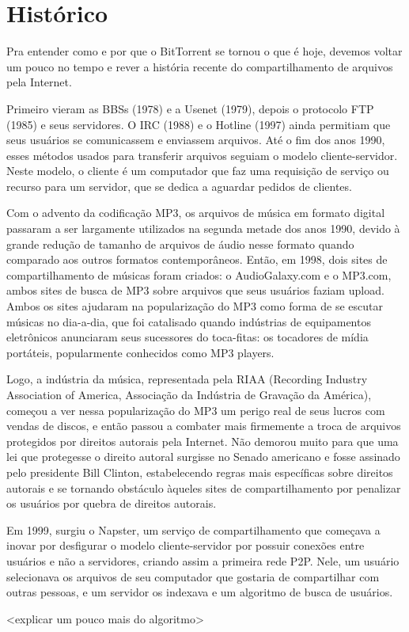 \chapter{Histórico}

Pra entender como e por que o BitTorrent se tornou o que é hoje, devemos voltar um pouco no tempo e rever a história recente do compartilhamento de arquivos pela Internet. 

Primeiro vieram as BBSs (1978) e a Usenet (1979), depois o protocolo FTP (1985) e seus servidores. O IRC (1988) e o  Hotline (1997) ainda permitiam que seus usuários se comunicassem e enviassem arquivos. Até o fim dos anos 1990, esses métodos usados para transferir arquivos seguiam o modelo cliente-servidor. Neste modelo, o cliente é um computador que faz uma requisição de serviço ou recurso para um servidor, que se dedica a aguardar pedidos de clientes. 

Com o advento da codificação MP3, os arquivos de música em formato digital passaram a ser largamente utilizados na segunda metade dos anos 1990, devido à grande redução de tamanho de arquivos de áudio nesse formato quando comparado aos outros formatos contemporâneos. Então, em 1998, dois sites de compartilhamento de músicas foram criados: o AudioGalaxy.com e o MP3.com, ambos sites de busca de MP3 sobre arquivos que seus usuários faziam upload. Ambos os sites ajudaram na popularização do MP3 como forma de se escutar músicas no dia-a-dia, que foi catalisado quando indústrias de equipamentos eletrônicos anunciaram seus sucessores do toca-fitas: os tocadores de mídia portáteis, popularmente conhecidos como MP3 players.

Logo, a indústria da música, representada pela RIAA (Recording Industry Association of America, Associação da Indústria de Gravação da América), começou a ver nessa popularização do MP3 um perigo real de seus lucros com vendas de discos, e então passou a combater mais firmemente a troca de arquivos protegidos por direitos autorais pela Internet. Não demorou muito para que uma lei que protegesse o direito autoral surgisse no Senado americano e fosse assinado pelo presidente Bill Clinton, estabelecendo regras mais específicas sobre direitos autorais e se tornando obstáculo àqueles sites de compartilhamento por penalizar os usuários por quebra de direitos autorais.

Em 1999, surgiu o Napster, um serviço  de compartilhamento que começava a inovar por desfigurar o modelo cliente-servidor por possuir conexões entre usuários e não a servidores, criando assim a primeira rede P2P. Nele, um usuário selecionava os arquivos de seu computador que gostaria de compartilhar com outras pessoas, e um servidor os indexava e um algoritmo de busca de usuários.

<explicar um pouco mais do algoritmo>